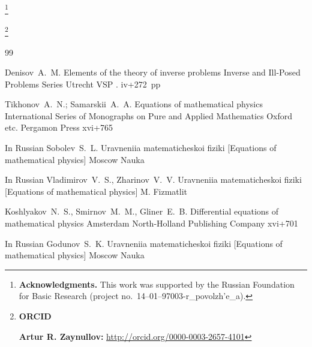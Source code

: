 \RuDate

\newpage

\makeentitle



\thanks{\textbf{Acknowledgments.} 
This work was  supported by the Russian Foundation for Basic Research  (project no.~14--01--97003-r\_povolzh'e\_a).}



\thanks{{\bf ORCID}

{\bf Artur R. Zaynullov:}    \url{http://orcid.org/0000-0003-2657-4101}



}




\EngRef

\Russian

\begin{thebibliography}{99}

\by Denisov~A.~M.
\book Elements of the theory of inverse problems
\serial Inverse and Ill-Posed Problems Series
\publaddr Utrecht
\publ VSP
.
iv+272~pp

\by Tikhonov~A.~N.; Samarskii~A.~A.
\book Equations of mathematical physics
\serial International Series of Monographs on Pure and Applied Mathematics
\publaddr Oxford etc.
\publ Pergamon Press
\totalpages xvi+765 


\lang In Russian
\by  Sobolev~S.~L.
\book Uravneniia matematicheskoi fiziki \rm [Equations of mathematical physics]
\publaddr Moscow
\publ Nauka


\lang In Russian
\by Vladimirov~V.~S., Zharinov~V.~V.
\book Uravneniia matematicheskoi fiziki \rm [Equations of mathematical physics]
\publaddr M.
\publ Fizmatlit

\by Koshlyakov~N.~S., Smirnov~M.~M., Gliner~E.~B.
\book Differential equations of mathematical physics
\publaddr Amsterdam
\publ North-Holland Publishing Company
\totalpages xvi+701 

\lang In Russian
\by Godunov~S.~K.
\book Uravneniia matematicheskoi fiziki \rm [Equations of mathematical physics]
\publaddr Moscow
\publ Nauka



\end{thebibliography}
